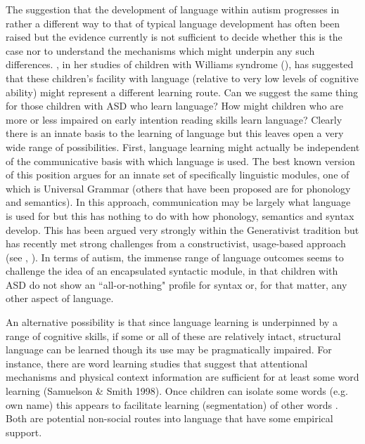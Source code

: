 \documentclass[output=paper]{langsci/langscibook}
\begin{document}
  The suggestion that the development of language within autism progresses in rather a different way to that of typical language development has often been raised but the evidence currently is not sufficient to decide whether this is the case nor to understand the mechanisms which might underpin any such differences. \citeauthor{Karmiloff-Smith2006}, in her studies of children with Williams syndrome (), has suggested that these children’s facility with language (relative to very low levels of cognitive ability) might represent a different learning route.  Can we suggest the same thing for those children with ASD who learn language?  How might children who are more or less impaired on early intention reading skills learn language?  Clearly there is an innate basis to the learning of language but this leaves open a very wide range of possibilities.  First, language learning might actually be independent of the communicative basis with which language is used.   The best known version of this position argues for an innate set of specifically linguistic modules, one of which is Universal Grammar  (others that have been proposed are for phonology and semantics).  In this approach, communication may be largely what language is used for but this has nothing to do with how phonology, semantics and syntax develop.  This has been argued very strongly within the Generativist tradition but has recently met strong challenges from a constructivist, usage-based approach (see \citeauthor{Ambridge2011} , \citeauthor{Ambridge2014} ). In terms of autism, the immense range of language outcomes seems to challenge the idea of an encapsulated syntactic module, in that children with ASD do not show an ``all-or-nothing" profile for syntax or, for that matter, any other aspect of language.   

An alternative possibility is that since language learning is underpinned by a range of cognitive skills,  if some or all of these are relatively intact, structural language can be learned though its use may be pragmatically impaired.  For instance, there are word learning studies that suggest that attentional mechanisms and physical context information are sufficient for at least some word learning (Samuelson \& Smith 1998).  Once children can isolate some words (e.g. own name) this appears to facilitate learning (segmentation) of other words \citep{Fernald2006,DePaolis2014}. Both are potential non-social routes into language that have some empirical support.  
\end{document}
